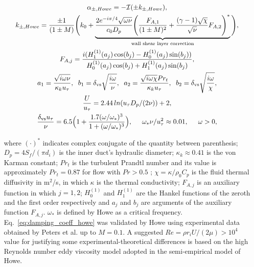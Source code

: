 \documentclass[12pt]{article}
\begin{document}
\begin{gather} \label{eq:damping_coeff_howe}
	\alpha_{\pm, Howe} = - \mathcal{I}(\pm k_{\pm, Howe}), \\
	k_{\pm, Howe} = \frac{\pm 1 }{ (1 \pm M)} \Bigg( k_0 +  \underbrace{ \frac{2 e^{-i \pi /4} \sqrt{\omega \nu} }{c_0 D_p }  \Bigg( \frac{ F_{A,1}  }{(1 \pm M)^2}  + \frac{ (\gamma - 1) \sqrt{\chi}  }{ \sqrt{\nu} } F_{A,2} \Bigg)^{*} }_\text{wall shear layer correction} \Bigg), \\
	F_{A,j}=\frac{i ( H_1^{(1)}(a_j) \cos(b_j) -  H_0^{(1)}(a_j) \sin(b_j)) }{ H_0^{(1)}(a_j) \cos(b_j) +  H_1^{(1)}(a_j) \sin(b_j) }, \\ 
	a_1 = \frac{\sqrt{i \omega \nu } }{ \kappa_k u_{\tau}}, \hspace{2mm} b_1 = \delta_{\text{vs}} \sqrt{\frac{i \omega}{\nu}}, \hspace{2mm} a_2 = \frac{\sqrt{i \omega \chi} Pr_t}{\kappa_k u_{\tau}}, \hspace{2mm} b_2 = \delta_{\text{vs}} \sqrt{\frac{i \omega}{\chi}}, \\ \label{eq:shear_velocity_howe}
	\frac{U}{u_{\tau}} = 2.44 \, ln(u_{\tau} D_p / (2 \nu) ) + 2, \\ 
	\frac{\delta_{\text{vs}} u_{\tau}}{\nu} = 6.5 \Big( 1 + \frac{1.7 (\omega / \omega_{*})^3}{1 + (\omega / \omega_{*})^3} \Big) , \hspace{5mm} \omega_{*} \nu / u_{\tau}^2 \approx 0.01 , \hspace{5mm} \omega > 0,  
\end{gather}

\noindent where $(\cdot)^{*}$ indicates complex conjugate of the quantity between parenthesis; $D_p = 4S_f / (\pi d_i)$ is the inner duct's hydraulic diameter; $\kappa_k \approx 0.41$ is the von Karman constant; $Pr_t $ is the turbulent Prandtl number and its value is approximately $Pr_t =0.87$ for flow with $Pr > 0.5 $ \cite{schlichting2016boundary}; $\chi = \kappa/\rho_0 C_p$ is the fluid thermal diffusivity in m$^2$/s, in which $\kappa$ is the thermal conductivity; $F_{A,j}$ is an auxiliary function in which $j=1,2$; $H_0^{(1)}$ and $H_1^{(1)}$ are the Hankel functions of the zeroth and the first order respectively and $a_j$ and $b_j$ are arguments of the auxiliary function $F_{A,j}$. $\omega_{*}$ is defined by Howe \cite{howe_1995} as a critical  frequency. Eq.~\ref{eq:damping_coeff_howe} was validated by Howe using experimental data obtained by Peters et al. \cite[see Fig.9. in ][]{peters_hirschberg_reijnen_wijnands_1993} up to $M = 0.1$. A suggested $Re=\rho r_i U / (2 \mu) > 10^4$ value for justifying some experimental-theoretical differences is based on the high Reynolds number eddy viscosity model adopted in the semi-empirical model of Howe.
\end{document}
